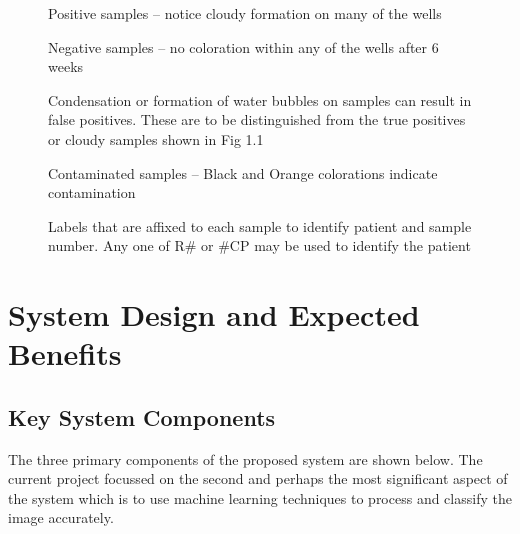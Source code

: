 \documentclass[a4paper,twoside,12pt]{report}
\begin{document}
\begin{figure}
\centering
\caption[Positive samples] {Positive samples – notice cloudy formation on many of the wells}
\end{figure}

\begin{figure}
\centering
\caption[Negative samples] {Negative samples – no coloration within any of the wells after 6 weeks}
\end{figure}

\begin{figure}
\centering
\caption[Condensation or Water samples] {Condensation or formation of water bubbles on samples can result in false positives.  These are to be distinguished from the true positives or cloudy samples shown in Fig 1.1}
\end{figure}

\begin{figure}
\centering
\caption[Contaminated samples] {Contaminated samples – Black and Orange colorations indicate contamination}
\end{figure}

\begin{figure}
\centering
\caption[Patient Label on samples] {Labels that are affixed to each sample to identify patient and sample number. Any one of R\# or \#CP may be used to identify the patient}
\end{figure}

\chapter{System Design and Expected Benefits}

\section{Key System Components}
The three primary components of the proposed system are shown below. The current project focussed on the second and perhaps the most significant aspect of the system which is to use machine learning techniques to process and classify the image accurately. 

\end{document}
